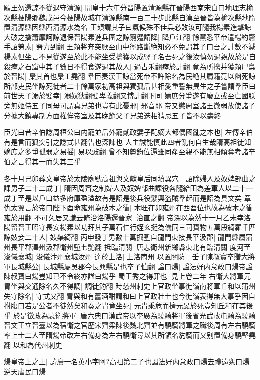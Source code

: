 願王勿還諒不從退守清源|{
	開皇十六年分晋陽置清源縣在晉陽西南宋白曰地理志榆次縣梗陽鄉魏戌邑今梗陽故城在清源縣南一百二十步此縣自漢至晉皆為榆次縣地隋置清源縣因縣西清源水為名}
王頍謂其子曰氣候殊不佳兵必敗汝可隨我楊素進擊諒大破之擒蕭摩訶諒退保晉陽素進兵圍之諒窮蹙請降|{
	降戶江翻}
餘黨悉平帝遣楊約齎手詔勞素|{
	勞力到翻}
王頍將奔突厥至山中徑路斷絶知必不免謂其子曰吾之計數不減楊素但坐言不見從遂至於此不能坐受擒獲以成竪子名吾死之後汝慎勿過親故於是自殺瘞之石窟中其子數日不得食遂過其故人|{
	過古禾翻瘞於計翻}
竟為所擒并獲頍尸梟於晉陽|{
	梟其首也梟工堯翻}
羣臣奏漢王諒當死帝不許除名為民絶其屬籍竟以幽死諒所部吏民坐諒死徙者二十餘萬家初高祖與獨孤后甚相愛重誓無異生之子嘗謂羣臣曰前世天子溺於嬖幸|{
	溺奴狄翻嬖卑義翻又博計翻下同}
嫡庶分爭遂有廢立或至亡國朕旁無姬侍五子同母可謂真兄弟也豈有此憂邪|{
	邪音耶}
帝又懲周室諸王微弱故使諸子分據大鎮專制方面權侔帝室及其晩節父子兄弟迭相猜忌五子皆不以壽終

臣光曰昔辛伯諗周桓公曰内寵並后外寵貳政嬖子配嫡大都偶國亂之本也|{
	左傳辛伯有是言而狐突引之諗式甚翻告也深諫也}
人主誠能慎此四者亂何自生哉隋高祖徒知嫡庶之多爭孤弱之易摇|{
	易以䜴翻}
曾不知勢鈞位逼雖同產至親不能無相傾奪考諸辛伯之言得其一而失其三乎

冬十月己卯葬文皇帝於太陵廟號高祖與文獻皇后同墳異穴　詔除婦人及奴婢部曲之課男子二十二成丁|{
	隋因周齊之制婦人及奴婢部曲課役各隨給田為差軍人以二十一成丁至是以戶口益多府庫盈溢故有是詔是後兵役䌓興盗賊羣起而是詔為具文矣}
章仇太翼言於帝曰陛下酉命雍州為破木之衝|{
	木旺在卯雍州在西酉位也故為破木之衝雍於用翻}
不可久居又䜟云脩治洛陽還晉家|{
	治直之翻}
帝深以為然十一月乙未幸洛陽留晉王昭守長安楊素以功拜其子萬石仁行姪玄挺為儀同三司賚物五萬段綺羅千匹諒妓妾二十人|{
	妓渠綺翻}
丙申發丁男數十萬掘塹自龍門東接長平汲郡|{
	龍門縣屬蒲州長平郡澤州汲郡衛州塹七艶翻}
抵臨清關|{
	唐志衛州新鄉縣東北有臨清關}
度河至浚儀襄城|{
	浚儀汴州襄城汝州}
達於上洛|{
	上洛商州}
以置關防　壬子陳叔寶卒贈大將軍長城縣公|{
	長城縣屬吳郡今長興縣是也卒子恤翻}
諡曰煬|{
	諡法好内怠政曰煬帝諡陳叔寶曰煬豈知已不令終亦諡曰煬乎}
蜀王秀之得罪也|{
	見上卷二年}
右衛大將軍元胄坐與交通除名久不得調|{
	調徒釣翻}
時慈州刺史上官政坐事徙嶺南將軍丘和以蒲州失守除名|{
	守式又翻}
胄與和有舊酒酣謂和曰上官政壯士也今徙嶺表得無大事乎因自拊腹曰若是公者不徒然矣和奏之胄竟坐死|{
	元胄乘危而擠元旻於死豈知丘和在其後乎}
於是徵政為驍衛將軍|{
	唐六典曰漢武帝以李廣為驍騎將軍後省光武改屯騎為驍騎晉文王立晉臺以為宿衛之官歷宋齊梁陳後魏北齊並有驍騎將軍之職後周有左右驍騎率上士二人至隋煬帝改左右備身為左右驍衛尋以其所領名豹騎而又别置備身驍堅堯翻}
以和為代州刺史

煬皇帝上之上|{
	諱廣一名英小字阿?高祖第二子也謚法好内怠政曰煬去禮遠衆曰煬逆天虐民曰煬}



